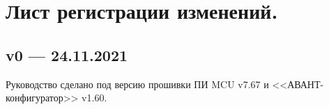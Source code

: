 \section*{Лист регистрации изменений.}

\subsection*{v0 --- 24.11.2021}

Руководство сделано под версию прошивки ПИ MCU v7.67 и <<АВАНТ-конфигуратор>> v1.60. 